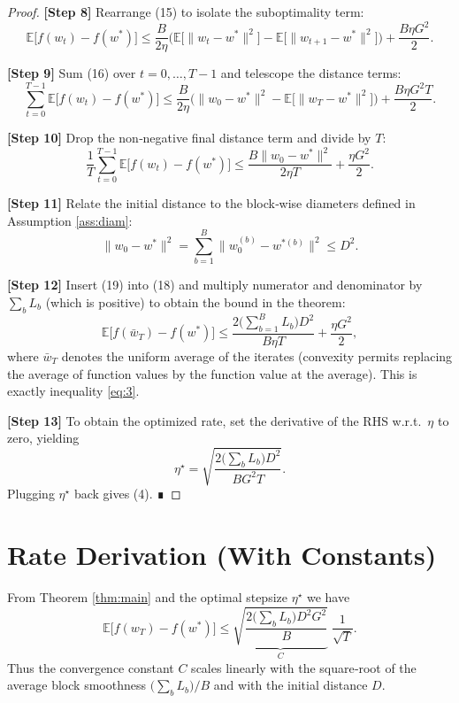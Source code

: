 \documentclass{article}
\newcommand{\E}{\mathbb{E}}
\begin{document}
\begin{proof}
\noindent\textbf{[Step 8]} Rearrange (15) to isolate the suboptimality term:
\[
\E\!\big[f(w_{t})-f(w^{*})\big]
\le
\frac{B}{2\eta}\Big(
\E\!\big[\|w_{t}-w^{*}\|^{2}\big]
-\E\!\big[\|w_{t+1}-w^{*}\|^{2}\big]\Big)
+\frac{B\eta G^{2}}{2}.
\tag{16}
\]

\noindent\textbf{[Step 9]} Sum (16) over $t=0,\dots ,T-1$ and telescope the distance terms:
\[
\sum_{t=0}^{T-1}\E\!\big[f(w_{t})-f(w^{*})\big]
\le
\frac{B}{2\eta}\Big(
\|w_{0}-w^{*}\|^{2}
-\E\!\big[\|w_{T}-w^{*}\|^{2}\big]\Big)
+ \frac{B\eta G^{2}T}{2}.
\tag{17}
\]

\noindent\textbf{[Step 10]} Drop the non‑negative final distance term and divide by $T$:
\[
\frac{1}{T}\sum_{t=0}^{T-1}\E\!\big[f(w_{t})-f(w^{*})\big]
\le
\frac{B\|w_{0}-w^{*}\|^{2}}{2\eta T}
+ \frac{\eta G^{2}}{2}.
\tag{18}
\]

\noindent\textbf{[Step 11]} Relate the initial distance to the block‑wise diameters defined in Assumption \ref{ass:diam}:
\[
\|w_{0}-w^{*}\|^{2}
=
\sum_{b=1}^{B}\|w_{0}^{(b)}-w^{*(b)}\|^{2}
\le D^{2}.
\tag{19}
\]

\noindent\textbf{[Step 12]} Insert (19) into (18) and multiply numerator and denominator by $\sum_{b}L_{b}$ (which is positive) to obtain the bound in the theorem:
\[
\E\!\big[f(\bar w_{T})-f(w^{*})\big]
\le
\frac{2\big(\sum_{b=1}^{B}L_{b}\big) D^{2}}{B\eta T}
+\frac{\eta G^{2}}{2},
\]
where $\bar w_{T}$ denotes the uniform average of the iterates (convexity permits replacing the average of function values by the function value at the average). This is exactly inequality \eqref{eq:3}.

\noindent\textbf{[Step 13]} To obtain the optimized rate, set the derivative of the RHS w.r.t.\ $\eta$ to zero, yielding
\[
\eta^{\star}= \sqrt{\frac{2\big(\sum_{b}L_{b}\big)D^{2}}{B G^{2}T}} .
\]
Plugging $\eta^{\star}$ back gives (4). ∎
\end{proof}

\section*{Rate Derivation (With Constants)}
From Theorem \ref{thm:main} and the optimal stepsize $\eta^{\star}$ we have
\[
\E\!\big[f(w_{T})-f(w^{*})\big]
\le
\underbrace{\sqrt{\frac{2\big(\sum_{b}L_{b}\big)D^{2}G^{2}}{B}}}_{\displaystyle C}
\; \frac{1}{\sqrt{T}}.
\]
Thus the convergence constant $C$ scales linearly with the square‑root of the average block smoothness $\big(\sum_{b}L_{b}\big)/B$ and with the initial distance $D$.
\end{document}
